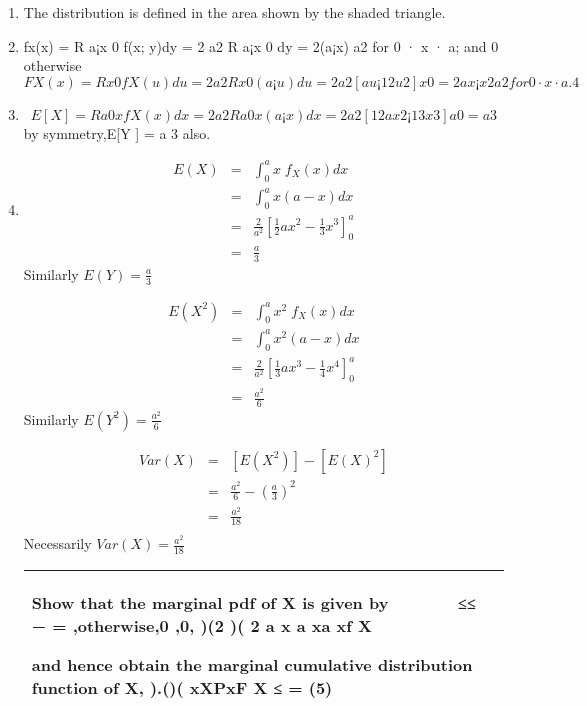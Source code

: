 \documentclass[a4paper,12pt]{article}
\begin{document}
\begin{enumerate}
\item The distribution is defined in the area shown by the shaded triangle.

\item  fx(x) =
R a¡x
0 f(x; y)dy = 2
a2
R a¡x
0 dy = 2(a¡x)
a2 for 0 · x · a; and 0 otherwise
\[FX(x) =
R x
0 fX(u)du = 2
a2
R x
0 (a ¡ u)du = 2
a2 [au ¡ 1
2u2]x
0 = 2ax¡x2
a2 for 0 · x · a.
4\]
\item \[E[X] =
R a
0 xfX(x)dx = 2
a2
R a
0 x(a ¡ x)dx = 2
a2 [ 1
2ax2 ¡ 1
3x3]a
0 = a
3 \]by symmetry,E[Y ] = a
3
also.
\item 

\begin{eqnarray*}
E(X) &=& \int^{a}_{0} x \;f_X(x) dx \\
    &=&\int^{a}_{0} x(a-x) dx \\
    &=&  \frac{2}{a^2}\left[ \frac{1}{2}ax^2 - \frac{1}{3}x^3  \right]^{a}_{0}\\
    &=& \frac{a}{3}  
\end{eqnarray*}
Similarly $E(Y) = \frac{a}{3} $

\begin{eqnarray*}
E(X^2) &=& \int^{a}_{0} x^2 \;f_X(x) dx \\
    &=&\int^{a}_{0} x^2(a-x) dx \\
    &=&  \frac{2}{a^2}\left[ \frac{1}{3}ax^3 - \frac{1}{4}x^4  \right]^{a}_{0}\\
    &=& \frac{a^2}{6}  
\end{eqnarray*}
Similarly $E(Y^2) = \frac{a^2}{6} $

\begin{eqnarray*}
Var(X) &=& [E(X^2)] - [E(X)^2] \\
      &=& \frac{a^2}{6} - \left(\frac{a}{3}\right)^2 \\
     &=& \frac{a^2}{18} \\
\end{eqnarray*}
Necessarily $Var(X) = \frac{a^2}{18}$


\newpage
  \begin{table}[ht!]
     \centering
     \begin{tabular}{|p{15cm}|}
     \hline
  Show that the marginal pdf of X is given by 
   
   
≤≤
−
=
,otherwise,0
,0,
)(2
)(
2 a x
a xa
xf X 
 
 and hence obtain the marginal cumulative distribution function of X, ).()( xXPxF X ≤ = (5)\\
\hline


\end{tabular}
\end{table}
\end{enumerate}
\end{document}
